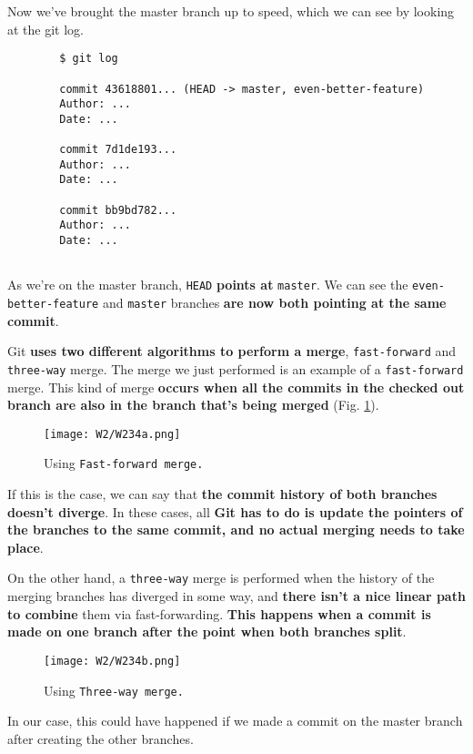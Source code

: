 	Now we've brought the master branch up to speed, which we can see by looking at the git log.
	
	\begin{verbatim}
		$ git log
		
		commit 43618801... (HEAD -> master, even-better-feature)
		Author: ...
		Date: ...
		
		commit 7d1de193... 
		Author: ...
		Date: ...
		
		commit bb9bd782... 
		Author: ...
		Date: ...
		
	\end{verbatim}	
	
	As we're on the master branch, \texttt{HEAD} \textbf{points at} \texttt{master}. We can see the \verb|even-better-feature| and \verb|master| branches \textbf{are now both pointing at the same commit}.
	
	Git \textbf{uses two different algorithms to perform a merge}, \verb|fast-forward| and \verb|three-way| merge. The merge we just performed is an example of a \verb|fast-forward| merge. This kind of merge \textbf{occurs when all the commits in the checked out branch are also in the branch that's being merged} (Fig. \ref{W234a}).
		
	\begin{figure} 
		\caption{Using \texttt{Fast-forward merge.}}
		\centering
		\texttt{[image: W2/W234a.png]}
		\label{W234a}
	\end{figure}	
	
	If this is the case, we can say that \textbf{the commit history of both branches doesn't diverge}. In these cases, all \textbf{Git has to do is update the pointers of the branches to the same commit, and no actual merging needs to take place}. 
	
	On the other hand, a \verb|three-way| merge is performed when the history of the merging branches has diverged in some way, and \textbf{there isn't a nice linear path to combine} them via fast-forwarding. \textbf{This happens when a commit is made on one branch after the point when both branches split}.
	
	\begin{figure} 
		\caption{Using \texttt{Three-way merge.}}
		\centering
		\texttt{[image: W2/W234b.png]}
		\label{W234b}
	\end{figure}	
	
	
	In our case, this could have happened if we made a commit on the master branch after creating the other branches.
	
